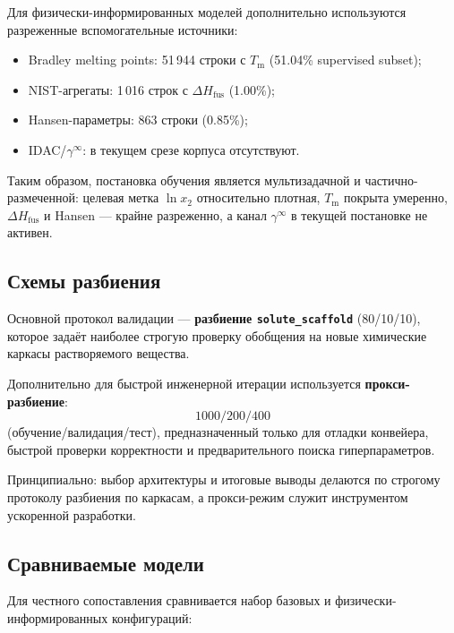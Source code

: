 \documentclass[11pt]{article}
\begin{document}
Для физически-информированных моделей дополнительно используются разреженные вспомогательные источники:
\begin{itemize}
  \item Bradley melting points: 51\,944 строки с $T_{\mathrm{m}}$ (51.04\% supervised subset);
  \item NIST-агрегаты: 1\,016 строк с $\Delta H_{\mathrm{fus}}$ (1.00\%);
  \item Hansen-параметры: 863 строки (0.85\%);
  \item IDAC/$\gamma^\infty$: в текущем срезе корпуса отсутствуют.
\end{itemize}

Таким образом, постановка обучения является мультизадачной и частично-размеченной: целевая метка $\ln x_2$ относительно плотная, $T_{\mathrm{m}}$ покрыта умеренно, $\Delta H_{\mathrm{fus}}$ и Hansen --- крайне разреженно, а канал $\gamma^\infty$ в текущей постановке не активен.

\subsection{Схемы разбиения}

Основной протокол валидации --- \textbf{разбиение \texttt{solute\_scaffold}} (80/10/10), которое задаёт наиболее строгую проверку обобщения на новые химические каркасы растворяемого вещества.

Дополнительно для быстрой инженерной итерации используется \textbf{прокси-разбиение}:
\begin{equation*}
1000 / 200 / 400
\end{equation*}
(обучение/валидация/тест), предназначенный только для отладки конвейера, быстрой проверки корректности и предварительного поиска гиперпараметров.

Принципиально: выбор архитектуры и итоговые выводы делаются по строгому протоколу разбиения по каркасам, а прокси-режим служит инструментом ускоренной разработки.

\subsection{Сравниваемые модели}

Для честного сопоставления сравнивается набор базовых и физически-информированных конфигураций:
\end{document}
